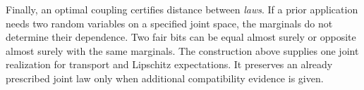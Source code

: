 Finally, an optimal coupling certifies distance between \emph{laws}. If a
prior application needs two random variables on a specified joint space,
the marginals do not determine their dependence. Two fair bits can be equal
almost surely or opposite almost surely with the same marginals. The
construction above supplies one joint realization for transport and Lipschitz
expectations. It preserves an already prescribed joint law only when additional
compatibility evidence is given.
